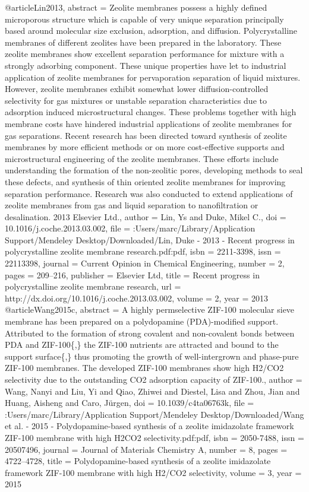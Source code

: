 @article{Lin2013,
abstract = {Zeolite membranes possess a highly defined microporous structure which is capable of very unique separation principally based around molecular size exclusion, adsorption, and diffusion. Polycrystalline membranes of different zeolites have been prepared in the laboratory. These zeolite membranes show excellent separation performance for mixture with a strongly adsorbing component. These unique properties have let to industrial application of zeolite membranes for pervaporation separation of liquid mixtures. However, zeolite membranes exhibit somewhat lower diffusion-controlled selectivity for gas mixtures or unstable separation characteristics due to adsorption induced microstructural changes. These problems together with high membrane costs have hindered industrial applications of zeolite membranes for gas separations. Recent research has been directed toward synthesis of zeolite membranes by more efficient methods or on more cost-effective supports and microstructural engineering of the zeolite membranes. These efforts include understanding the formation of the non-zeolitic pores, developing methods to seal these defects, and synthesis of thin oriented zeolite membranes for improving separation performance. Research was also conducted to extend applications of zeolite membranes from gas and liquid separation to nanofiltration or desalination. {\textcopyright} 2013 Elsevier Ltd.},
author = {Lin, Ys and Duke, Mikel C.},
doi = {10.1016/j.coche.2013.03.002},
file = {:Users/marc/Library/Application Support/Mendeley Desktop/Downloaded/Lin, Duke - 2013 - Recent progress in polycrystalline zeolite membrane research.pdf:pdf},
isbn = {2211-3398},
issn = {22113398},
journal = {Current Opinion in Chemical Engineering},
number = {2},
pages = {209--216},
publisher = {Elsevier Ltd},
title = {{Recent progress in polycrystalline zeolite membrane research}},
url = {http://dx.doi.org/10.1016/j.coche.2013.03.002},
volume = {2},
year = {2013}
}
@article{Wang2015c,
abstract = {A highly permselective ZIF-100 molecular sieve membrane has been prepared on a polydopamine (PDA)-modified support. Attributed to the formation of strong covalent and non-covalent bonds between PDA and ZIF-100{\{},{\}} the ZIF-100 nutrients are attracted and bound to the support surface{\{},{\}} thus promoting the growth of well-intergrown and phase-pure ZIF-100 membranes. The developed ZIF-100 membranes show high H2/CO2 selectivity due to the outstanding CO2 adsorption capacity of ZIF-100.},
author = {Wang, Nanyi and Liu, Yi and Qiao, Zhiwei and Diestel, Lisa and Zhou, Jian and Huang, Aisheng and Caro, J{\"{u}}rgen},
doi = {10.1039/c4ta06763k},
file = {:Users/marc/Library/Application Support/Mendeley Desktop/Downloaded/Wang et al. - 2015 - Polydopamine-based synthesis of a zeolite imidazolate framework ZIF-100 membrane with high H2CO2 selectivity.pdf:pdf},
isbn = {2050-7488},
issn = {20507496},
journal = {Journal of Materials Chemistry A},
number = {8},
pages = {4722--4728},
title = {{Polydopamine-based synthesis of a zeolite imidazolate framework ZIF-100 membrane with high H2/CO2 selectivity}},
volume = {3},
year = {2015}
}
